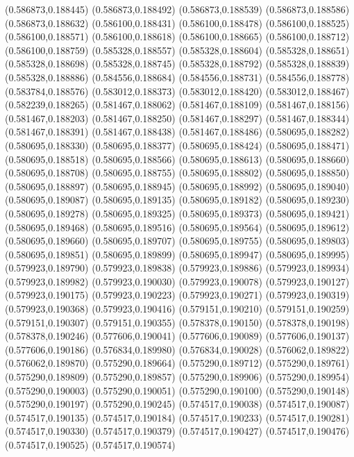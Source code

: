 (0.586873,0.188445)
(0.586873,0.188492)
(0.586873,0.188539)
(0.586873,0.188586)
(0.586873,0.188632)
(0.586100,0.188431)
(0.586100,0.188478)
(0.586100,0.188525)
(0.586100,0.188571)
(0.586100,0.188618)
(0.586100,0.188665)
(0.586100,0.188712)
(0.586100,0.188759)
(0.585328,0.188557)
(0.585328,0.188604)
(0.585328,0.188651)
(0.585328,0.188698)
(0.585328,0.188745)
(0.585328,0.188792)
(0.585328,0.188839)
(0.585328,0.188886)
(0.584556,0.188684)
(0.584556,0.188731)
(0.584556,0.188778)
(0.583784,0.188576)
(0.583012,0.188373)
(0.583012,0.188420)
(0.583012,0.188467)
(0.582239,0.188265)
(0.581467,0.188062)
(0.581467,0.188109)
(0.581467,0.188156)
(0.581467,0.188203)
(0.581467,0.188250)
(0.581467,0.188297)
(0.581467,0.188344)
(0.581467,0.188391)
(0.581467,0.188438)
(0.581467,0.188486)
(0.580695,0.188282)
(0.580695,0.188330)
(0.580695,0.188377)
(0.580695,0.188424)
(0.580695,0.188471)
(0.580695,0.188518)
(0.580695,0.188566)
(0.580695,0.188613)
(0.580695,0.188660)
(0.580695,0.188708)
(0.580695,0.188755)
(0.580695,0.188802)
(0.580695,0.188850)
(0.580695,0.188897)
(0.580695,0.188945)
(0.580695,0.188992)
(0.580695,0.189040)
(0.580695,0.189087)
(0.580695,0.189135)
(0.580695,0.189182)
(0.580695,0.189230)
(0.580695,0.189278)
(0.580695,0.189325)
(0.580695,0.189373)
(0.580695,0.189421)
(0.580695,0.189468)
(0.580695,0.189516)
(0.580695,0.189564)
(0.580695,0.189612)
(0.580695,0.189660)
(0.580695,0.189707)
(0.580695,0.189755)
(0.580695,0.189803)
(0.580695,0.189851)
(0.580695,0.189899)
(0.580695,0.189947)
(0.580695,0.189995)
(0.579923,0.189790)
(0.579923,0.189838)
(0.579923,0.189886)
(0.579923,0.189934)
(0.579923,0.189982)
(0.579923,0.190030)
(0.579923,0.190078)
(0.579923,0.190127)
(0.579923,0.190175)
(0.579923,0.190223)
(0.579923,0.190271)
(0.579923,0.190319)
(0.579923,0.190368)
(0.579923,0.190416)
(0.579151,0.190210)
(0.579151,0.190259)
(0.579151,0.190307)
(0.579151,0.190355)
(0.578378,0.190150)
(0.578378,0.190198)
(0.578378,0.190246)
(0.577606,0.190041)
(0.577606,0.190089)
(0.577606,0.190137)
(0.577606,0.190186)
(0.576834,0.189980)
(0.576834,0.190028)
(0.576062,0.189822)
(0.576062,0.189870)
(0.575290,0.189664)
(0.575290,0.189712)
(0.575290,0.189761)
(0.575290,0.189809)
(0.575290,0.189857)
(0.575290,0.189906)
(0.575290,0.189954)
(0.575290,0.190003)
(0.575290,0.190051)
(0.575290,0.190100)
(0.575290,0.190148)
(0.575290,0.190197)
(0.575290,0.190245)
(0.574517,0.190038)
(0.574517,0.190087)
(0.574517,0.190135)
(0.574517,0.190184)
(0.574517,0.190233)
(0.574517,0.190281)
(0.574517,0.190330)
(0.574517,0.190379)
(0.574517,0.190427)
(0.574517,0.190476)
(0.574517,0.190525)
(0.574517,0.190574)
